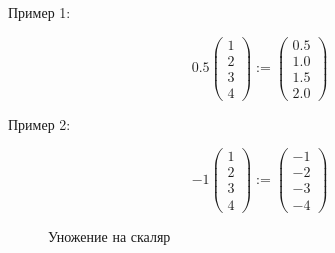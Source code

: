 \begin{frame}

    Пример 1:

    \begin{equation*}
        0.5 
        \left(
        \begin{array}{c}
            1 \\
            2 \\
            3 \\
            4
        \end{array}
        \right)
        :=
        \left(
        \begin{array}{c}
            0.5 \\
            1.0 \\
            1.5 \\
            2.0 
        \end{array}
        \right)
    \end{equation*}

    Пример 2:

    \begin{equation*}
        -1
        \left(
        \begin{array}{c}
            1 \\
            2 \\
            3 \\
            4
        \end{array}
        \right)
        :=
        \left(
        \begin{array}{c}
            -1 \\
            -2 \\
            -3 \\
            -4
        \end{array}
        \right)
    \end{equation*}
\end{frame}

\begin{frame}
    
\begin{figure}
  \begin{center}
    \caption{\label{f:vec_scalar} Уножение на скаляр}
 \end{center}
\end{figure}

\end{frame}



